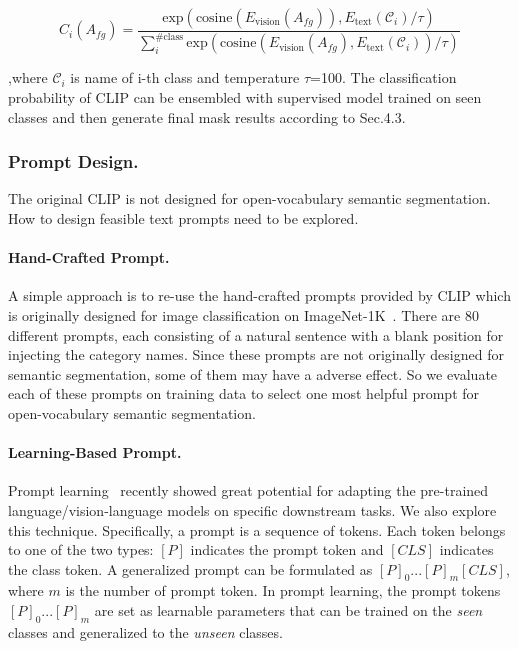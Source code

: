 \documentclass[runningheads]{llncs}
\begin{document}
\begin{equation}
    C_i(A_{fg}) = \frac{\text{exp}(\text{cosine}(E_{\text{vision}}(A_{fg})), E_{\text{text}}(\mathcal{C}_i)/\tau)}{\sum_{i}^{\text{\#class}} \text{exp}(\text{cosine}(E_{\text{vision}}(A_{fg}), E_{\text{text}}(\mathcal{C}_i))/\tau)}
\end{equation}

\noindent,where $\mathcal{C}_i$ is name of i-th class and temperature $\tau$=100. The classification probability of CLIP can be ensembled with supervised model trained on seen classes and then generate final mask results according to Sec.4.3.

\subsubsection{Prompt Design.}
\label{sec:text_promp}
The original CLIP is not designed for open-vocabulary semantic segmentation. How to design feasible text prompts need to be explored.  
\paragraph{Hand-Crafted Prompt.}
A simple approach is to re-use the hand-crafted prompts provided by CLIP which is originally designed for image classification on ImageNet-1K~\cite{deng2009imagenet}. There are 80 different prompts, each consisting of a natural sentence with a blank position for injecting the category names. Since these prompts are not originally designed for semantic segmentation, some of them may have a adverse effect. So we evaluate each of these prompts on training data to select one most helpful prompt for open-vocabulary semantic segmentation.

\paragraph{Learning-Based Prompt.}
Prompt learning~\cite{liu2021pre,zhou2021learning} recently showed great potential for adapting the pre-trained language/vision-language models on specific downstream tasks. We also explore this technique. Specifically, a prompt is a sequence of tokens. Each token belongs to one of the two types: $[P]$ indicates the prompt token and $[CLS]$ indicates the class token. A generalized prompt can be formulated as $[P]_0...[P]_m[CLS]$, where $m$ is the number of prompt token. In prompt learning, the prompt tokens $[P]_0...[P]_m$ are set as learnable parameters that can be trained on the \emph{seen} classes and generalized to the \emph{unseen} classes. 
\end{document}
